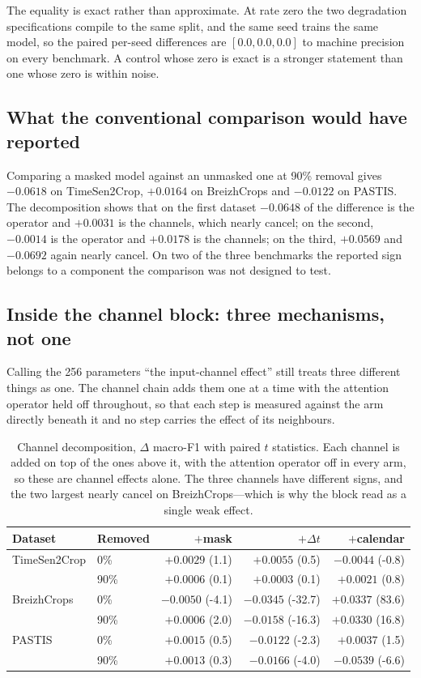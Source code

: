 \documentclass[journal]{IEEEtran}
\begin{document}
The equality is exact rather than approximate. At rate zero the two degradation
specifications compile to the same split, and the same seed trains the same
model, so the paired per-seed differences are $[0.0, 0.0, 0.0]$ to machine
precision on every benchmark. A control whose zero is exact is a stronger
statement than one whose zero is within noise.

\subsection{What the conventional comparison would have reported}
Comparing a masked model against an unmasked one at 90\% removal gives
$-0.0618$ on TimeSen2Crop, $+0.0164$ on BreizhCrops and $-0.0122$ on PASTIS.
The decomposition shows that on the first dataset $-0.0648$ of the difference is
the operator and $+0.0031$ is the channels, which nearly cancel; on the second,
$-0.0014$ is the operator and $+0.0178$ is the channels; on the third, $+0.0569$
and $-0.0692$ again nearly cancel. On two of the three benchmarks the reported
sign belongs to a component the comparison was not designed to test.

\subsection{Inside the channel block: three mechanisms, not one}
\label{sec:channels}

Calling the 256 parameters ``the input-channel effect'' still treats three
different things as one. The channel chain adds them one at a time with the
attention operator held off throughout, so that each step is measured against
the arm directly beneath it and no step carries the effect of its neighbours.

\begin{table}[t]
\centering
\caption{Channel decomposition, $\Delta$ macro-F1 with paired $t$ statistics.
Each channel is added on top of the ones above it, with the attention operator
off in every arm, so these are channel effects alone. The three channels have
different signs, and the two largest nearly cancel on BreizhCrops---which is
why the block read as a single weak effect.}
\label{tab:channels}
\scriptsize
\begin{tabular}{llrrr}
\toprule
Dataset & Removed & $+$mask & $+\Delta t$ & $+$calendar \\
\midrule
TimeSen2Crop & 0\%  & $+0.0029$ (1.1) & $+0.0055$ (0.5) & $-0.0044$ (-0.8) \\
             & 90\% & $+0.0006$ (0.1) & $+0.0003$ (0.1) & $+0.0021$ (0.8) \\
\addlinespace
BreizhCrops  & 0\%  & $-0.0050$ (-4.1) & $-0.0345$ (-32.7) & $+0.0337$ (83.6) \\
             & 90\% & $+0.0006$ (2.0) & $-0.0158$ (-16.3) & $+0.0330$ (16.8) \\
\addlinespace
PASTIS       & 0\%  & $+0.0015$ (0.5) & $-0.0122$ (-2.3) & $+0.0037$ (1.5) \\
             & 90\% & $+0.0013$ (0.3) & $-0.0166$ (-4.0) & $-0.0539$ (-6.6) \\
\bottomrule
\end{tabular}
\end{table}
\end{document}
